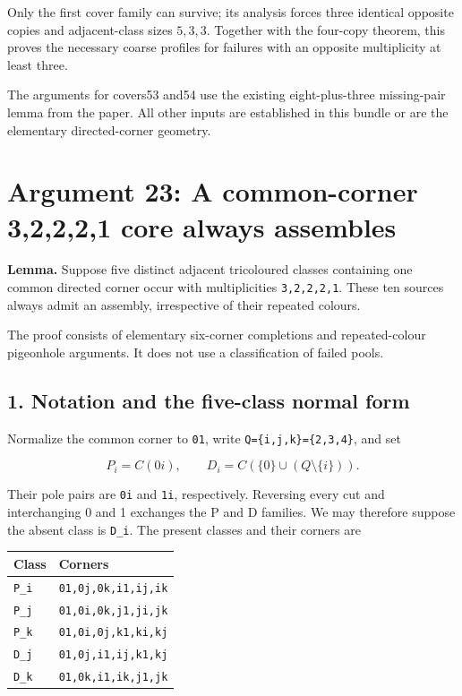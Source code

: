 \documentclass[
  10pt,
]{article}
\begin{document}
Only the first cover family can survive; its analysis forces three
identical opposite copies and adjacent-class sizes \(5,3,3\). Together
with the four-copy theorem, this proves the necessary coarse profiles
for failures with an opposite multiplicity at least three.

The arguments for covers53 and54 use the existing eight-plus-three
missing-pair lemma from the paper. All other inputs are established in
this bundle or are the elementary directed-corner geometry.

\hypertarget{arg-23}{%
\section{Argument 23: A common-corner 3,2,2,2,1 core always
assembles}\label{arg-23}}

\textbf{Lemma.} Suppose five distinct adjacent tricoloured classes
containing one common directed corner occur with multiplicities
\texttt{3,2,2,2,1}. These ten sources always admit an assembly,
irrespective of their repeated colours.

The proof consists of elementary six-corner completions and
repeated-colour pigeonhole arguments. It does not use a classification
of failed pools.

\hypertarget{notation-and-the-five-class-normal-form}{%
\subsection*{1. Notation and the five-class normal
form}\label{notation-and-the-five-class-normal-form}}

Normalize the common corner to \texttt{01}, write
\texttt{Q=\{i,j,k\}=\{2,3,4\}}, and set

\[
P_i=C(0i),\qquad D_i=C(\{0\}\cup(Q\setminus\{i\})).
\]

Their pole pairs are \texttt{0i} and \texttt{1i}, respectively.
Reversing every cut and interchanging 0 and 1 exchanges the P and D
families. We may therefore suppose the absent class is \texttt{D\_i}.
The present classes and their corners are

\begin{longtable}[]{@{}ll@{}}
\toprule\noalign{}
Class & Corners \\
\midrule\noalign{}
\endhead
\bottomrule\noalign{}
\endlastfoot
\texttt{P\_i} & \texttt{01,0j,0k,i1,ij,ik} \\
\texttt{P\_j} & \texttt{01,0i,0k,j1,ji,jk} \\
\texttt{P\_k} & \texttt{01,0i,0j,k1,ki,kj} \\
\texttt{D\_j} & \texttt{01,0j,i1,ij,k1,kj} \\
\texttt{D\_k} & \texttt{01,0k,i1,ik,j1,jk} \\
\end{longtable}
\end{document}
